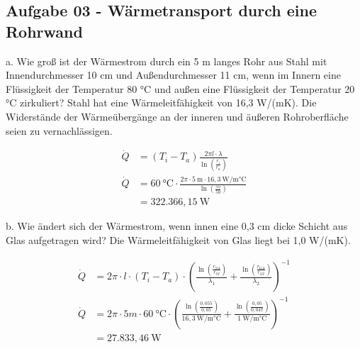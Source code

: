 \documentclass[a4paper,10pt]{article}
\begin{document}
\pagebreak

\subsection*{Aufgabe 03 - Wärmetransport durch eine Rohrwand}

a. Wie groß ist der Wärmestrom durch ein 5 m langes Rohr aus Stahl mit
Innendurchmesser 10 cm und Außendurchmesser 11 cm, wenn im Innern eine
Flüssigkeit der Temperatur 80 °C und außen eine Flüssigkeit der Temperatur
20 °C zirkuliert? Stahl hat eine Wärmeleitfähigkeit von 16,3 W/(mK). Die
Widerstände der Wärmeübergänge an der inneren und äußeren Rohroberfläche
seien zu vernachlässigen.
\pp 

\begin{align*}
\dot{Q} &= (T_i - T_a) \frac{2 \pi l \cdot \lambda}{\ln(\frac{r_i}{r_a})} \\
\dot{Q} &= 60~ \text{°C} \cdot \frac{2 \pi \cdot 5~\text{m} \cdot 16,3~ \text{W/m°C} }{\ln(\frac{55}{50})} \\
	&= 322.366,15~ \text{W}
\end{align*}


\ppbig

b. Wie ändert sich der Wärmestrom, wenn innen eine 0,3 cm dicke Schicht aus
Glas aufgetragen wird? Die Wärmeleitfähigkeit von Glas liegt bei 1,0 W/(mK).
\pp

\begin{align*}
\dot{Q} &= 2 \pi \cdot l \cdot (T_i - T_a) \cdot \left( \frac{\ln(\frac{r_{SA}}{r_{SI}})}{\lambda_1} + \frac{\ln(\frac{r_{GA}}{r_{GI}})}{\lambda_2} \right)^{-1} \\
\dot{Q} &= 2 \pi \cdot 5m \cdot 60~ \text{°C} \cdot \left( {\frac{\ln(\frac{0,055}{0,05})}{16,3~ \text{W/m°C}} + \frac{\ln(\frac{0,05}{0,047})}{1~ \text{W/m°C}}} \right)^{-1} \\
	&= 27.833,46~ \text{W}
\end{align*}

\ppbig
\begin{center}

\end{center}
\end{document}
